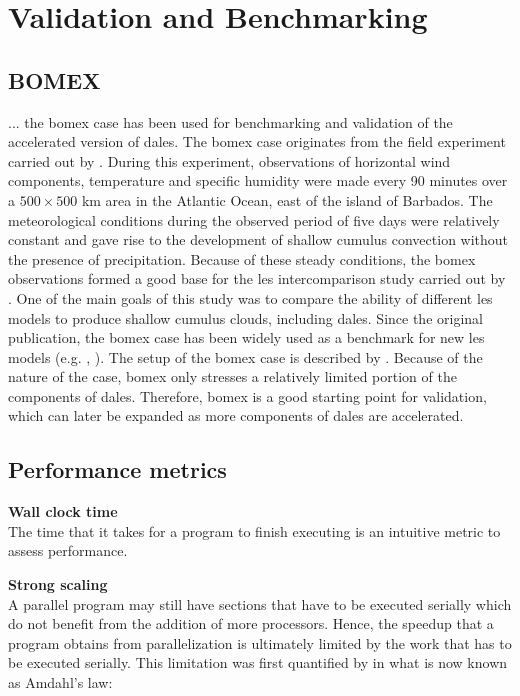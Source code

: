 \chapter{Validation and Benchmarking}

\section{BOMEX}
... the \acrfull{bomex} case has been used for benchmarking and validation of the accelerated version of \acrshort{dales}. The \acrshort{bomex} case originates from the field experiment carried out by \citet{hollandMeasurementsAtmosphericMass1973}. During this experiment, observations of horizontal wind components, temperature and specific humidity were made every 90 minutes over a $500 \times 500$ km area in the Atlantic Ocean, east of the island of Barbados. The meteorological conditions during the observed period of five days were relatively constant and gave rise to the development of shallow cumulus convection without the presence of precipitation. Because of these steady conditions, the \acrshort{bomex} observations formed a good base for the \acrshort{les} intercomparison study carried out by \citet{siebesmaLargeEddySimulation2003}. One of the main goals of this study was to compare the ability of different \acrshort{les} models to produce shallow cumulus clouds, including \acrshort{dales}. Since the original publication, the \acrshort{bomex} case has been widely used as a benchmark for new \acrshort{les} models (e.g. \citet{vanheerwaardenMicroHHComputationalFluid2017}, ). The setup of the \acrshort{bomex} case is described by \citet{siebesmaEvaluationParametricAssumptions1995}. Because of the nature of the case, \acrshort{bomex} only stresses a relatively limited portion of the components of \acrshort{dales}. Therefore, \acrshort{bomex} is a good starting point for validation, which can later be expanded as more components of \acrshort{dales} are accelerated.

\section{Performance metrics}

\noindent \textbf{Wall clock time} \\
The time that it takes for a program to finish executing is an intuitive metric to assess performance. 

\medskip

\noindent \textbf{Strong scaling} \\
A parallel program may still have sections that have to be executed serially which do not benefit from the addition of more processors. Hence, the speedup that a program obtains from parallelization is ultimately limited by the work that has to be executed serially. This limitation was first quantified by \citet{amdahlValiditySingleProcessor1967} in what is now known as Amdahl's law: 

